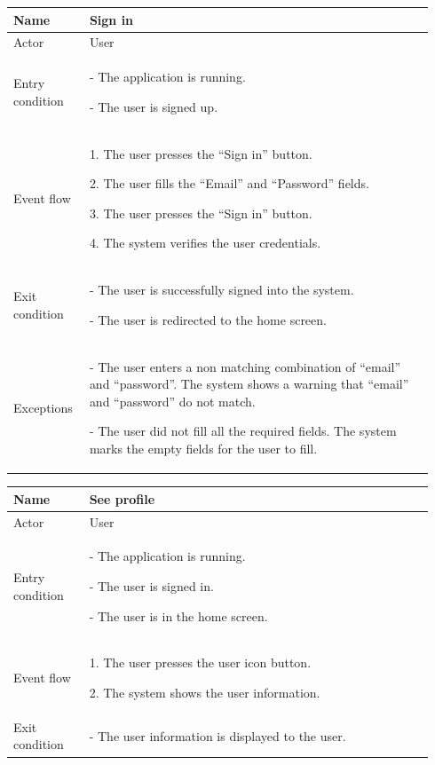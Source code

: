 \begin{table}[H]
\begin{tabular}{|p{0.17\linewidth}|p{0.77\linewidth}|}
\hline
Name            & Sign in
\\ \hline

Actor           & User
\\ \hline

Entry condition &
- The application is running.

- The user is signed up.
\\ \hline
Event flow      & 
    1. The user presses the “Sign in” button.

    2. The user fills the “Email” and “Password” fields.

    3. The user presses the “Sign in” button.
    
    4. The system verifies the user credentials.
\\ \hline
Exit condition  & 
    - The user is successfully signed into the system.

    - The user is redirected to the home screen.
\\ \hline
Exceptions      &
    - The user enters a non matching combination of “email” and “password”. The system shows a warning that “email” and “password” do not match.

    - The user did not fill all the required fields. The system marks the empty fields for the user to fill.
\\ \hline
\end{tabular}
\end{table}

\begin{table}[H]
\begin{tabular}{|p{0.17\linewidth}|p{0.77\linewidth}|}
\hline
Name            & See profile
\\ \hline

Actor           & User
\\ \hline

Entry condition &
- The application is running.

- The user is signed in.

- The user is in the home screen.
\\ \hline
Event flow      & 
    1. The user presses the user icon button.

    2. The system shows the user information.
\\ \hline
Exit condition  & 
    - The user information is displayed to the user.
\\ \hline
\end{tabular}
\end{table}

